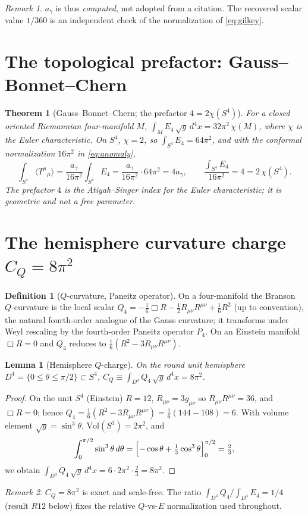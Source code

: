 \documentclass[11pt,a4paper]{article}
\newtheorem{theorem}{Theorem}
\newtheorem{lemma}{Lemma}
\theoremstyle{definition}
\newtheorem{definition}{Definition}
\theoremstyle{remark}
\newtheorem{remark}{Remark}
\newcommand{\ag}{a_\gamma}
\newcommand{\CQ}{C_Q}
\newcommand{\avg}[1]{\langle #1\rangle}
\begin{document}
\begin{remark}
$\ag$ is thus \emph{computed}, not adopted from a citation. The recovered scalar value $1/360$ is
an independent check of the normalization of \eqref{eq:gilkey}.
\end{remark}

\section{The topological prefactor: Gauss--Bonnet--Chern}\label{sec:gbc}
\begin{theorem}[Gauss--Bonnet--Chern; the prefactor $4=2\chi(S^4)$]\label{thm:gbc}
For a closed oriented Riemannian four-manifold $M$,
$\displaystyle\int_M E_4\,\sqrt g\,d^4x=32\pi^2\,\chi(M)$, where $\chi$ is the Euler
characteristic. On $S^4$, $\chi=2$, so $\int_{S^4}E_4=64\pi^2$, and with the conformal
normalization $16\pi^2$ in \eqref{eq:anomaly},
\[
\int_{S^4}\avg{T^\mu{}_\mu}=\frac{\ag}{16\pi^2}\int_{S^4}E_4=\frac{\ag}{16\pi^2}\cdot 64\pi^2=4\ag,
\qquad
\frac{\int_{S^4}E_4}{16\pi^2}=4=2\,\chi(S^4).
\]
The prefactor $4$ is the Atiyah--Singer index for the Euler characteristic; it is geometric and
not a free parameter. \cite{Chern,AtiyahSinger}
\end{theorem}

\section{The hemisphere curvature charge $\CQ=8\pi^2$}\label{sec:Q}
\begin{definition}[$Q$-curvature, Paneitz operator]
On a four-manifold the Branson $Q$-curvature is the local scalar
$Q_4=-\tfrac16\Box R-\tfrac12 R_{\mu\nu}R^{\mu\nu}+\tfrac16 R^2$ (up to convention), the natural
fourth-order analogue of the Gauss curvature; it transforms under Weyl rescaling by the
fourth-order Paneitz operator $P_4$. On an Einstein manifold $\Box R=0$ and $Q_4$ reduces to
$\tfrac16(R^2-3R_{\mu\nu}R^{\mu\nu})$.
\end{definition}

\begin{lemma}[Hemisphere $Q$-charge]\label{lem:qcharge}
On the round unit hemisphere $D^4=\{0\le\theta\le\pi/2\}\subset S^4$,
$\displaystyle\CQ\equiv\int_{D^4}Q_4\,\sqrt g\,d^4x=8\pi^2$.
\end{lemma}
\begin{proof}
On the unit $S^4$ (Einstein) $R=12$, $R_{\mu\nu}=3g_{\mu\nu}$ so $R_{\mu\nu}R^{\mu\nu}=36$, and
$\Box R=0$; hence $Q_4=\tfrac16(R^2-3R_{\mu\nu}R^{\mu\nu})=\tfrac16(144-108)=6$. With volume
element $\sqrt g=\sin^3\theta$, $\mathrm{Vol}(S^3)=2\pi^2$, and
\[
\int_0^{\pi/2}\sin^3\theta\,d\theta=\Bigl[-\cos\theta+\tfrac13\cos^3\theta\Bigr]_0^{\pi/2}=\tfrac23,
\]
we obtain $\int_{D^4}Q_4\,\sqrt g\,d^4x=6\cdot 2\pi^2\cdot\tfrac23=8\pi^2.$
\end{proof}
\begin{remark}
$\CQ=8\pi^2$ is exact and scale-free. The ratio $\int_{D^4}Q_4/\int_{D^4}E_4=1/4$ (result $R12$
below) fixes the relative $Q$-vs-$E$ normalization used throughout.
\end{remark}
\end{document}
